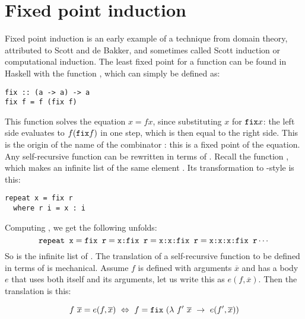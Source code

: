 \section{Fixed point induction}

Fixed point induction is an early example of a technique
from domain theory, attributed to Scott and de Bakker,
and sometimes called Scott induction or computational induction.
\cite{domains} The least fixed point for a function can be found in
Haskell with the function , which can simply be defined as:

\begin{verbatim}
fix :: (a -> a) -> a
fix f = f (fix f)
\end{verbatim}

This function solves the equation $x = f x$, since substituting $x$
for $\hs{fix} x$: the left side evaluates to $f (\hs{fix} f)$ in one
step, which is then equal to the right side. This is the origin of the
name of the combinator : this is a fixed point of the equation.
Any self-recursive function can be rewritten in terms of
. Recall the  function , which makes an
infinite list of the same element . Its
transformation to -style is this:

\begin{verbatim}
repeat x = fix r
  where r i = x : i
\end{verbatim}

Computing , we get the following unfolds:
\begin{equation*}
  \hs{repeat x}
= \hs{fix r}
= \hs{x:fix r}
= \hs{x:x:fix r}
= \hs{x:x:x:fix r}
  \cdots
\end{equation*}
So  is the infinite list of . The translation of a
self-recursive function to be defined in terms of  is
mechanical. Assume $f$ is defined with arguments $\overline{x}$ and
has a body $e$ that uses both itself and its arguments, let us write
this as $e(f,\overline{x})$. Then the translation is this:

\begin{equation*}
f \w \overline{x} \eq e(f,\overline{x})
\w \Leftrightarrow \w
f \eq \hs{fix} \w (\lambda \w f' \w \overline{x} \w \rightarrow \w e(f',\overline{x}))
\end{equation*}

